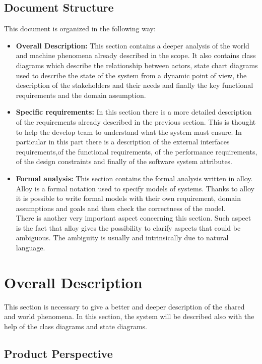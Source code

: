 \documentclass[titlepage]{article}
\begin{document}
\subsection{Document Structure}
This document is organized in the following way:
\begin{itemize}
	\item \textbf{Overall Description:} This section contains a deeper analysis of the world and machine phenomena already described in the scope. It also contains class diagrams which describe the relationship between actors, state chart diagrams used to describe the state of the system from a dynamic point of view, the description of the stakeholders and their needs and finally the key functional requirements and the domain assumption.
	
	\item \textbf{Specific requirements:} In this section there is a more detailed description of the requirements already described in the previous section. This is thought to help the develop team to understand what the system must ensure. In particular in this part there is a description of the external interfaces requirements,of the functional requirements, of the performance requirements, of the design constraints and finally of the software system attributes.
	
	\item \textbf{Formal analysis:} This section contains the formal analysis written in alloy. Alloy is a formal notation used to specify models of systems. Thanks to alloy it is possible to write formal models with their own requirement, domain assumptions and goals and then check the correctness of the model.\\
There is another very important aspect concerning this section. Such aspect is the fact that alloy gives the possibility to clarify aspects that could be ambiguous. The ambiguity is usually and intrinsically due to natural language. 
\end{itemize}
\newpage

\section{Overall Description}
This section is necessary to give a better and deeper description of the shared and world phenomena. In this section, the system will be described also with the help of the class diagrams and state diagrams.
\subsection{Product Perspective}
\end{document}
